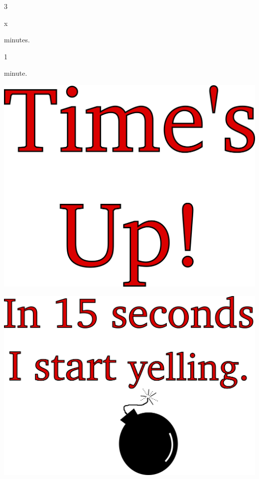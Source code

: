 \documentclass[12pt]{article}
\begin{document}
\begin{landscape}


\begin{center}



\begin{numberfont}
3 
\end{numberfont}
\vspace{1in}x
\begin{titlefont}
minutes.
\end{titlefont}

\newpage

\begin{numberfont}
1 
\end{numberfont}
\vspace{1in}
\begin{titlefont}
minute.
\end{titlefont}

\newpage

\includegraphics[scale=1]{timecardtimesup.png}

\includegraphics[scale=0.96]{timecardyelling.png}


\end{center}
\end{landscape}
\end{document}
